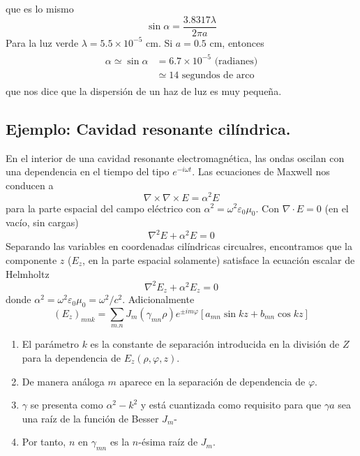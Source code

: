que es lo mismo
\begin{equation}
\sin \alpha = \dfrac{3.8317 \lambda}{2 \pi a}
\label{eq:ecuacion_11_37}
\end{equation}
Para la luz verde $\lambda=5.5 \times 10^{-5}$ cm. Si $a=0.5$ cm, entonces
\begin{eqnarray}
\begin{aligned}
\alpha \simeq \sin \alpha &= 6.7 \times 10^{-5} \text{ (radianes)} \\
&\simeq 14 \text{ segundos de arco}
\end{aligned}
\label{eq:ecuacion_11_38}
\end{eqnarray}
que nos dice que la dispersión de un haz de luz es muy pequeña.
\subsection{Ejemplo: Cavidad resonante cilíndrica.}
En el interior de una cavidad resonante electromagnética, las ondas oscilan con una dependencia en el tiempo del tipo $e^{-i \omega t}$. Las ecuaciones de Maxwell nos conducen a
\[ \nabla \times \nabla \times E = \alpha^{2} E \]
para la parte espacial del campo eléctrico con $\alpha^{2} = \omega^{2} \varepsilon_{0} \mu_{0}$. Con $\nabla \cdot E=0$ (en el vacío, sin cargas)
\[ \nabla^{2} E + \alpha^{2} E = 0 \]
Separando las variables en coordenadas cilíndricas circualres, encontramos que la componente $z$ ($E_{z}$, en la parte espacial solamente) satisface la ecuación escalar de Helmholtz
\begin{equation}
\nabla^{2} E_{z} + \alpha^{2} E_{z} = 0
\label{eq:ecuacion_11_39}
\end{equation}
donde $\alpha^{2} =  \omega^{2} \varepsilon_{0} \mu_{0} = \omega^{2}/c^{2}$. Adicionalmente
\begin{equation}
(E_{z})_{mnk} = \sum_{m.n} J_{m} (\gamma_{mn} \rho) e^{\pm im\varphi} [ a_{mn} \sin kz + b_{mn} \cos kz ]
\label{eq:ecuacion_11_40}
\end{equation}
\begin{enumerate}
\item El parámetro $k$ es la constante de separación introducida en la división de $Z$ para la dependencia de $E_{z}(\rho, \varphi,z)$.
\item De manera análoga $m$ aparece en la separación de dependencia de $\varphi$.
\item $\gamma$ se presenta como $\alpha^{2} - k^{2}$ y está cuantizada como requisito para que $\gamma a$ sea una raíz de la función de Besser $J_{m}$-
\item Por tanto, $n$ en $\gamma_{mn}$ es la $n$-ésima raíz de $J_{m}$.
\end{enumerate}
